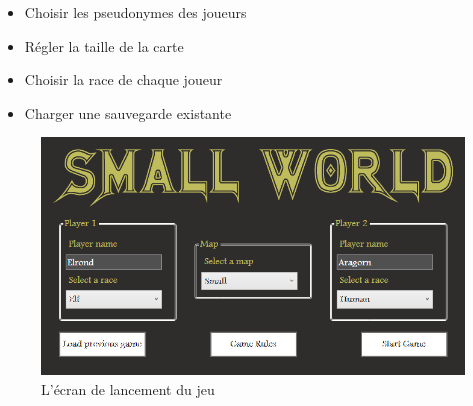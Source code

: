 \documentclass[a4paper]{article}
\begin{document}
\begin{itemize}
    \item Choisir les pseudonymes des joueurs
    \item Régler la taille de la carte
    \item Choisir la race de chaque joueur
    \item Charger une sauvegarde existante
\end{itemize}


\begin{figure}[h]
\begin{center}
\includegraphics[scale=0.4]{./img/start_screen.png}
\caption{L'écran de lancement du jeu}
\end{center}
\end{figure}
\end{document}
